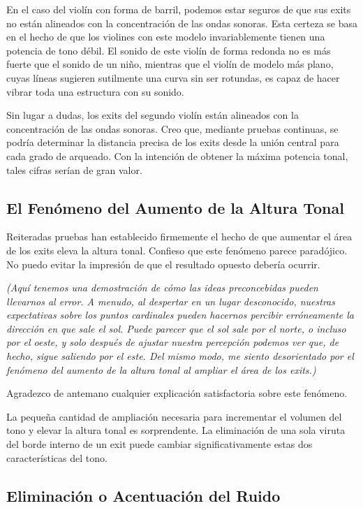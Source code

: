 \documentclass[12pt]{book}
\begin{document}
En el caso del violín con forma de barril, podemos estar seguros de que sus exits no están alineados con la concentración de las ondas sonoras. Esta certeza se basa en el hecho de que los violines con este modelo invariablemente tienen una potencia de tono débil. El sonido de este violín de forma redonda no es más fuerte que el sonido de un niño, mientras que el violín de modelo más plano, cuyas líneas sugieren sutilmente una curva sin ser rotundas, es capaz de hacer vibrar toda una estructura con su sonido.

Sin lugar a dudas, los exits del segundo violín están alineados con la concentración de las ondas sonoras. Creo que, mediante pruebas continuas, se podría determinar la distancia precisa de los exits desde la unión central para cada grado de arqueado. Con la intención de obtener la máxima potencia tonal, tales cifras serían de gran valor.

\subsection*{El Fenómeno del Aumento de la Altura Tonal}

Reiteradas pruebas han establecido firmemente el hecho de que aumentar el área de los exits eleva la altura tonal. Confieso que este fenómeno parece paradójico. No puedo evitar la impresión de que el resultado opuesto debería ocurrir.

\textit{(Aquí tenemos una demostración de cómo las ideas preconcebidas pueden llevarnos al error. A menudo, al despertar en un lugar desconocido, nuestras expectativas sobre los puntos cardinales pueden hacernos percibir erróneamente la dirección en que sale el sol. Puede parecer que el sol sale por el norte, o incluso por el oeste, y solo después de ajustar nuestra percepción podemos ver que, de hecho, sigue saliendo por el este. Del mismo modo, me siento desorientado por el fenómeno del aumento de la altura tonal al ampliar el área de los exits.)}  

Agradezco de antemano cualquier explicación satisfactoria sobre este fenómeno.

La pequeña cantidad de ampliación necesaria para incrementar el volumen del tono y elevar la altura tonal es sorprendente. La eliminación de una sola viruta del borde interno de un exit puede cambiar significativamente estas dos características del tono.

\subsection*{Eliminación o Acentuación del Ruido}
\end{document}
